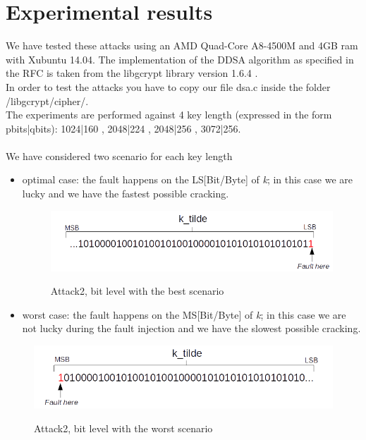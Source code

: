 \documentclass[11pt,english]{article}
\begin{document}
\section{Experimental results}
We have tested these attacks using an AMD Quad-Core A8-4500M and 4GB ram with Xubuntu 14.04. 
The implementation of the DDSA algorithm as specified in the RFC\cite{rfc} is taken from the libgcrypt library version 1.6.4 \cite{lib}.\\
In order to test the attacks you have to copy our file dsa.c inside the folder /libgcrypt/cipher/.
\\The experiments are performed against 4 key length (expressed in the form pbits|qbits): 1024|160 , 2048|224 , 2048|256 , 3072|256.\\\\
We have considered two scenario for each key length
\begin{itemize}
\item optimal case: the fault happens on the LS[Bit/Byte] of \textit{k}; in this case we are lucky and we have the fastest possible cracking.

\begin{figure}[H]
\includegraphics[width=1.0\textwidth]{img/bestcasebitfault.png} \\
\caption{\label{f_etichetta}Attack2, bit level with the best scenario }
\end{figure}

\item worst case: the fault happens on the MS[Bit/Byte] of \textit{k}; in this case we are not lucky during the fault injection and we have the slowest possible cracking.
\end{itemize}

\begin{figure}[H]
\includegraphics[width=1.0\textwidth]{img/worstcasebitfault.png} \\
\caption{\label{f_etichetta}Attack2, bit level with the worst scenario }
\end{figure}
\end{document}
